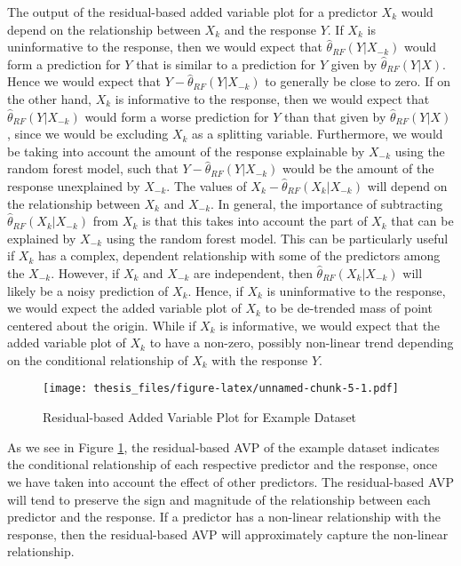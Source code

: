 \documentclass[12pt,twoside]{reedthesis}
\theoremstyle{definition}
\theoremstyle{definition}
\theoremstyle{definition}
\theoremstyle{remark}
\begin{document}
The output of the residual-based added variable plot for a predictor
\(X_k\) would depend on the relationship between \(X_k\) and the
response \(Y\). If \(X_k\) is uninformative to the response, then we
would expect that \(\hat{\theta}_{RF}(Y|X_{-k})\) would form a
prediction for \(Y\) that is similar to a prediction for \(Y\) given by
\(\hat{\theta}_{RF}(Y|X)\). Hence we would expect that
\(Y-\hat{\theta}_{RF}(Y|X_{-k})\) to generally be close to zero. If on
the other hand, \(X_k\) is informative to the response, then we would
expect that \(\hat{\theta}_{RF}(Y|X_{-k})\) would form a worse
prediction for \(Y\) than that given by \(\hat{\theta}_{RF}(Y|X)\),
since we would be excluding \(X_k\) as a splitting variable.
Furthermore, we would be taking into account the amount of the response
explainable by \(X_{-k}\) using the random forest model, such that
\(Y-\hat{\theta}_{RF}(Y|X_{-k})\) would be the amount of the response
unexplained by \(X_{-k}\). The values of
\(X_k-\hat{\theta}_{RF}(X_k|X_{-k})\) will depend on the relationship
between \(X_k\) and \(X_{-k}\). In general, the importance of
subtracting \(\hat{\theta}_{RF}(X_k|X_{-k})\) from \(X_k\) is that this
takes into account the part of \(X_k\) that can be explained by
\(X_{-k}\) using the random forest model. This can be particularly
useful if \(X_k\) has a complex, dependent relationship with some of the
predictors among the \(X_{-k}\). However, if \(X_k\) and \(X_{-k}\) are
independent, then \(\hat{\theta}_{RF}(X_k|X_{-k})\) will likely be a
noisy prediction of \(X_k\). Hence, if \(X_k\) is uninformative to the
response, we would expect the added variable plot of \(X_k\) to be
de-trended mass of point centered about the origin. While if \(X_k\) is
informative, we would expect that the added variable plot of \(X_k\) to
have a non-zero, possibly non-linear trend depending on the conditional
relationship of \(X_k\) with the response \(Y\). \par
\begin{figure}
\centering
\texttt{[image: thesis\_files/figure-latex/unnamed-chunk-5-1.pdf]}
\caption{\label{fig:unnamed-chunk-5}\label{AVPresex}Residual-based Added
Variable Plot for Example Dataset}
\end{figure}
As we see in Figure \ref{AVPresex}, the residual-based AVP of the
example dataset indicates the conditional relationship of each
respective predictor and the response, once we have taken into account
the effect of other predictors. The residual-based AVP will tend to
preserve the sign and magnitude of the relationship between each
predictor and the response. If a predictor has a non-linear relationship
with the response, then the residual-based AVP will approximately
capture the non-linear relationship.
\end{document}
